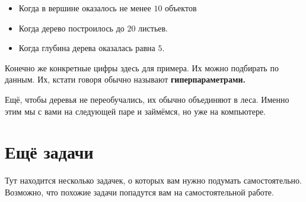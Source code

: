 \documentclass[12pt, a4paper, oneside]{article}
\theoremstyle{plain} %
\theoremstyle{definition}
\newcommand{\indef}[1]{\textbf{ \color{green} #1}}
\begin{document}
\begin{solution}
\begin{itemize} 
	\item  Когда в вершине оказалось не менее $10$ объектов
	\item  Когда дерево построилось до $20$ листьев. 	
	\item  Когда глубина дерева оказалась равна $5$.
\end{itemize}
	
Конечно же конкретные цифры здесь для примера. Их можно подбирать по данным. Их, кстати говоря обычно называют \indef{гиперпараметрами.} 

Ещё, чтобы деревья не переобучались, их обычно объединяют в леса. Именно этим мы с вами на следующей паре и займёмся, но уже на компьютере. 
\end{solution}


\section*{Ещё задачи} 

Тут находится несколько задачек, о которых вам нужно подумать самостоятельно. Возможно, что похожие задачи попадутся вам на самостоятельной работе.
\end{document}
